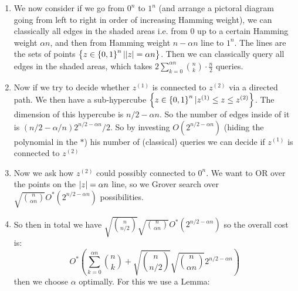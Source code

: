 \begin{enumerate}
    \item We now consider if we go from $0^n$ to $1^n$ (and arrange a pictoral diagram going from left to right in order of increasing Hamming weight), we can classically all edges in the shaded areas i.e. from $0$ up to a certain Hamming weight $\alpha n$, and then from Hamming weight $n - \alpha n$ line to $1^n$. The lines are the sets of points $\set{z \in \set{0, 1}^n \vert \lvert z \rvert = \alpha n}$.  Then we can classically query all edges in the shaded areas, which takes $2\sum_{k=0}^{\alpha n}\binom{n}{k} \cdot \frac{n}{2}$ queries.
    \item Now if we try to decide whether $z^{(1)}$ is connected to $z^{(2)}$ via a directed path. We then have a sub-hypercube $\set{z \in \set{0, 1}^n \vert z^{(1)} \leq z \leq z^{(2)}}$. The dimension of this hypercube is $n/2 - \alpha n$. So the number of edges inside of it is $(n/2 - \alpha/n)2^{n/2-\alpha n}/2$. So by investing $O(2^{n/2-\alpha n})$ (hiding the polynomial in the $*$) his number of (classical) queries we can decide if $z^{(1)}$ is connected to $z^{(2)}$
    \item Now we ask how $z^{(2)}$ could possibly connected to $0^n$. We want to OR over the points on the $\lvert z \rvert = \alpha n$ line, so we Grover search over $\sqrt{\binom{n}{\alpha n}}O^*(2^{n/2-\alpha n})$ possibilities.
    \item So then in total we have $\sqrt{\binom{n}{n/2}}\sqrt{\binom{n}{\alpha n}}O^*(2^{n/2-\alpha n})$ so the overall cost is:
    \begin{equation}
        O^*(\sum_{k=0}^{\alpha n}\binom{n}{k} + \sqrt{\binom{n}{n/2}}\sqrt{\binom{n}{\alpha n}}2^{n/2-\alpha n})
    \end{equation}
    then we choose $\alpha$ optimally. For this we use a Lemma:


\end{enumerate}
